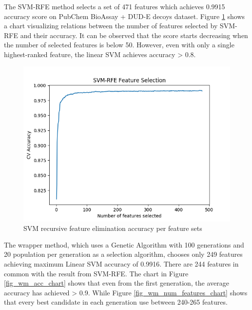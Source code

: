 \documentclass[conference]{IEEEtran}
\begin{document}
The SVM-RFE method selects a set of 471 features which achieves 0.9915 accuracy score on PubChem BioAssay + DUD-E decoys dataset. Figure \ref{fig_svmrfe_acc_num_features_chart} shows a chart visualizing relations between the number of features selected by SVM-RFE and their accuracy. It can be observed that the score starts decreasing when the number of selected features is below 50. However, even with only a single highest-ranked feature, the linear SVM achieves accuracy > 0.8.

\begin{figure}
	\includegraphics[scale=0.5]{../images/SVM_RFE_chart.png}
	\caption{SVM recursive feature elimination accuracy per feature sets}
	\label{fig_svmrfe_acc_num_features_chart}
\end{figure}

The wrapper method, which uses a Genetic Algorithm with 100 generations and 20 population per generation as a selection algorithm, chooses only 249 features achieving maximum Linear SVM accuracy of 0.9916. There are 244 features in common with the result from SVM-RFE. The chart in Figure \ref{fig_wm_acc_chart} shows that even from the first generation, the average accuracy has achieved > 0.9. While Figure \ref{fig_wm_num_features_chart} shows that every best candidate in each generation use between 240-265 features.
\end{document}
